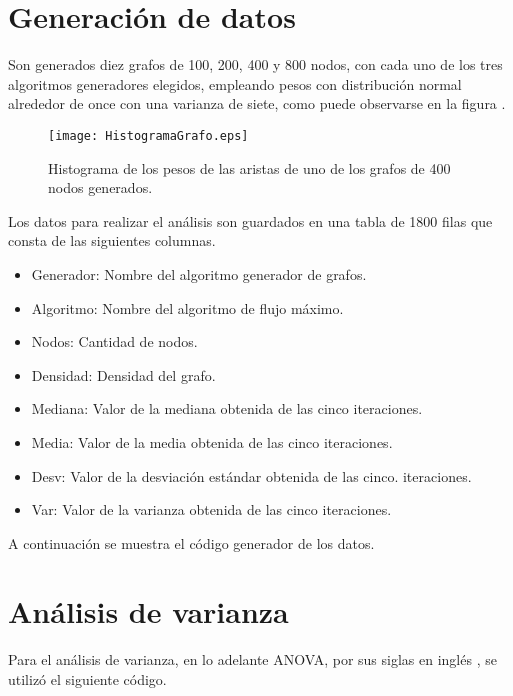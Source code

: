 \documentclass{article}
\begin{document}
\section*{Generación de datos}

Son generados diez grafos de 100, 200, 400 y 800 nodos, con cada uno de los tres algoritmos generadores elegidos, empleando pesos con distribución normal alrededor de once con una varianza de siete, como puede observarse en la figura \pageref{Figura 1}.

\begin{figure}
\begin{center}
  \texttt{[image: HistogramaGrafo.eps]}
\end{center}
\vspace*{-8mm}
\caption{Histograma de los pesos de las aristas de uno de los grafos de 400 nodos generados.}
  \label{Figura 1} 
\end{figure}

Los datos para realizar el análisis son guardados en una tabla de 1800 filas que consta de las siguientes columnas.

\begin{itemize}
\item Generador: Nombre del algoritmo generador de grafos.	
\item Algoritmo: Nombre del algoritmo de flujo máximo.	
\item Nodos: Cantidad de nodos.	
\item Densidad: Densidad del grafo.
\item Mediana: Valor de la mediana obtenida de las cinco iteraciones.	
\item Media: Valor de la media obtenida de las cinco iteraciones.	
\item Desv: Valor de la desviación estándar obtenida de las cinco. iteraciones.
\item Var: Valor de la varianza obtenida de las cinco iteraciones.	
\end{itemize}

A continuación se muestra el código generador de los datos.

 

\section*{Análisis de varianza}

Para el análisis de varianza, en lo adelante ANOVA, por sus siglas en inglés \citep{anova}, se utilizó el siguiente código.
\end{document}
